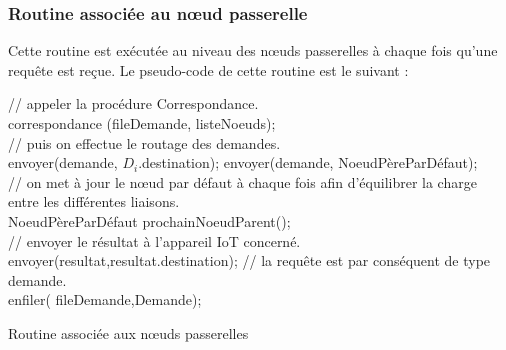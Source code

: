\subsubsection{Routine associée au nœud passerelle}
Cette routine est exécutée au niveau des nœuds passerelles à chaque fois qu’une requête est reçue.
Le pseudo-code de cette routine est le suivant :\\
\begin{algorithm}[H]
 {  
    // appeler la  procédure Correspondance.\\
    correspondance (fileDemande, listeNoeuds);\\
    // puis on effectue le routage des demandes.\\
   {
     {envoyer(demande, $D_i$.destination);}
     {
         envoyer(demande, NoeudPèreParDéfaut);\\
        // on met à jour le nœud par défaut à chaque fois afin d'équilibrer la charge entre les différentes liaisons.\\
     NoeudPèreParDéfaut \gets prochainNoeudParent();\\
     }
   }
 }
 {
   {// envoyer le résultat à l'appareil IoT concerné.\\
        envoyer(resultat,resultat.destination);
   }
   {// la requête est par conséquent de type demande.\\
     enfiler( fileDemande,Demande);
   }
 }
 \caption{Routine associée aux nœuds passerelles\\ \\}
\end{algorithm}
